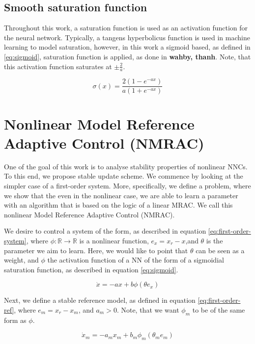 \subsection{Smooth saturation function}
Throughout this work, a saturation function is used as an activation function for the neural network. Typically, a tangens hyperbolicus function is used in machine learning to model saturation, however, in this work a sigmoid based, as defined in \eqref{eq:sigmoid}, saturation function is applied, as done in \textbf{wahby, thanh}. Note, that this activation function saturates at $\pm \frac{2}{a}$.

\begin{equation}
    \sigma (x) = \frac{2(1-e^{-ax})}{a(1+e^{-ax})}
    \label{eq:sigmoid}
\end{equation}

\section{Nonlinear Model Reference Adaptive Control (NMRAC)}
\label{sec:MRAC-Nonlinear-SISO}

One of the goal of this work is to analyse stability properties of nonlinear NNCs. To this end, we propose stable update scheme. We commence by looking at the simpler case of a first-order system. More, specifically, we define a problem, where we show that the even in the nonlinear case, we are able to learn a parameter with an algorithm that is based on the logic of a linear MRAC. We call this nonlinear Model Reference Adaptive Control (NMRAC).

We desire to control a system of the form, as described in equation \eqref{eq:first-order-system}, where $\phi: \mathbb{R}\rightarrow\mathbb{R}$ is a nonlinear function, $e_x=x_r - x$,and $\theta$ is the parameter we aim to learn. Here, we would like to point that $\theta$ can be seen as a weight, and $\phi$ the activation function of a NN of the form of a sigmoidial saturation function, as described in equation \eqref{eq:sigmoid}.

\begin{equation}
    \dot x = -ax + b\phi(\theta e_x)
    \label{eq:first-order-system}
\end{equation}

Next, we define a stable reference model, as defined in equation \eqref{eq:first-order-ref}, where $e_m=x_r - x_m$, and $a_m>0$. Note, that we want $\phi_m$ to be of the same form as $\phi$.

\begin{equation}
    \dot x_m = -a_mx_m + b_m\phi_m(\theta_m e_m)
    \label{eq:first-order-ref}
\end{equation}

